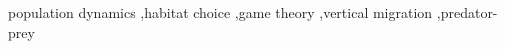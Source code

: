 \documentclass[review,authoryear]{elsarticle}
\begin{document}
\begin{keyword} population dynamics \sep habitat choice \sep game theory \sep vertical migration \sep predator-prey %
\end{keyword}


\maketitle




\linenumbers{}
\modulolinenumbers[3]






%




\end{document}
